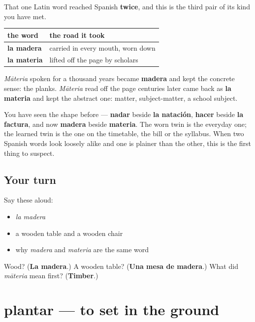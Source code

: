 \begin{culture}
That one Latin word reached Spanish \textbf{twice}, and this is the third pair of its kind you have met.

\noindent
\begin{tabularx}{\linewidth}{@{}>{\raggedright\arraybackslash}X>{\raggedright\arraybackslash}X@{}}
\toprule
\textbf{the word} & \textbf{the road it took} \\
\midrule
\textbf{la madera} & carried in every mouth, worn down \\
\textbf{la materia} & lifted off the page by scholars \\
\bottomrule
\end{tabularx}

\emph{Māteria} spoken for a thousand years became \textbf{madera} and kept the concrete sense: the planks. \emph{Māteria} read off the page centuries later came back as \textbf{la materia} and kept the abstract one: matter, subject-matter, a school subject.

You have seen the shape before — \textbf{nadar} beside \textbf{la natación}, \textbf{hacer} beside \textbf{la factura}, and now \textbf{madera} beside \textbf{materia}. The worn twin is the everyday one; the learned twin is the one on the timetable, the bill or the syllabus. When two Spanish words look loosely alike and one is plainer than the other, this is the first thing to suspect.
\end{culture}

\subsection*{Your turn}
Say these aloud:

\begin{itemize}
\raggedright
  \item \emph{la madera}
  \item a wooden table and a wooden chair
  \item why \emph{madera} and \emph{materia} are the same word
\end{itemize}

\begin{tcolorbox}[breakable,colback=teal!4,colframe=teal!35!black,title={Before you move on}]
Wood? (\textbf{La madera}.) A wooden table? (\textbf{Una mesa de madera}.) What did \emph{māteria} mean first? (\textbf{Timber}.)
\end{tcolorbox}
\section[plantar]{plantar — to set in the ground}

